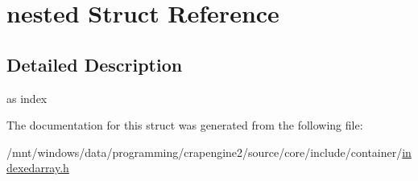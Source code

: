 \hypertarget{structnested}{\section{nested Struct Reference}
\label{structnested}
}


\subsection{Detailed Description}
as index 

The documentation for this struct was generated from the following file\+:\begin{DoxyCompactItemize}
\item 
/mnt/windows/data/programming/crapengine2/source/core/include/container/\hyperlink{indexedarray_8h}{indexedarray.\+h}\end{DoxyCompactItemize}
